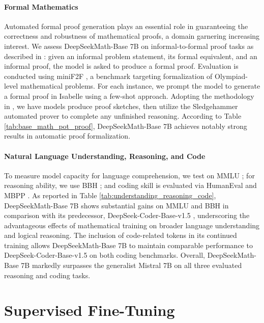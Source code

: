 \paragraph{Formal Mathematics}

Automated formal proof generation plays an essential role in guaranteeing the correctness and robustness of mathematical proofs, a domain garnering increasing interest. We assess DeepSeekMath-Base 7B on informal-to-formal proof tasks as described in \citep{dsp_proof}: given an informal problem statement, its formal equivalent, and an informal proof, the model is asked to produce a formal proof. Evaluation is conducted using miniF2F \citep{minif2f}, a benchmark targeting formalization of Olympiad-level mathematical problems. For each instance, we prompt the model to generate a formal proof in Isabelle using a few-shot approach. Adopting the methodology in \cite{dsp_proof}, we have models produce proof sketches, then utilize the Sledgehammer automated prover \citep{sledgehammer} to complete any unfinished reasoning. According to Table \ref{tab:base_math_pot_proof}, DeepSeekMath-Base 7B achieves notably strong results in automatic proof formalization.

\paragraph{Natural Language Understanding, Reasoning, and Code}

To measure model capacity for language comprehension, we test on MMLU \citep{mmlu}; for reasoning ability, we use BBH \citep{bbh}; and coding skill is evaluated via HumanEval \citep{codex} and MBPP \citep{mbpp}. As reported in Table \ref{tab:understanding_reasoning_code}, DeepSeekMath-Base 7B shows substantial gains on MMLU and BBH in comparison with its predecessor, DeepSeek-Coder-Base-v1.5 \citep{deepseek-coder}, underscoring the advantageous effects of mathematical training on broader language understanding and logical reasoning. The inclusion of code-related tokens in its continued training allows DeepSeekMath-Base 7B to maintain comparable performance to DeepSeek-Coder-Base-v1.5 on both coding benchmarks. Overall, DeepSeekMath-Base 7B markedly surpasses the generalist Mistral 7B \citep{mistral} on all three evaluated reasoning and coding tasks.

\section{Supervised Fine-Tuning}

